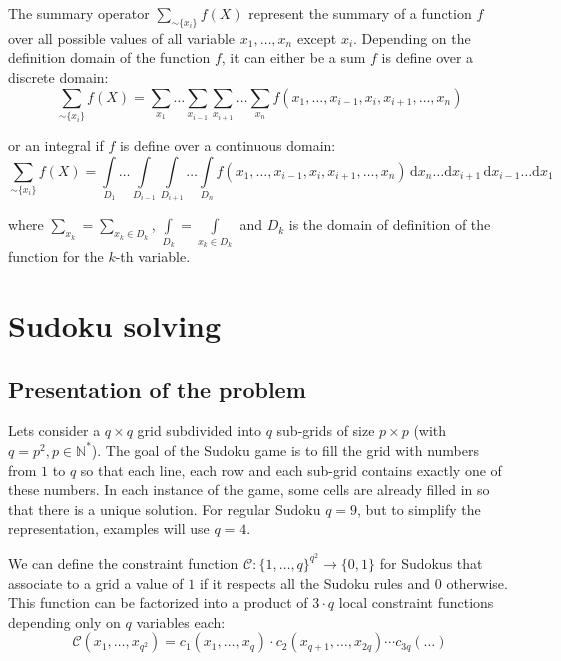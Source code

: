 \documentclass[a4paper,11pt]{report}
\newcommand{\N}{\mathbb{N}}
\newcommand{\set}[1]{\{#1\}}
\newcommand{\zo}{\set{0,1}}
\begin{document}
The summary operator $\sum_{\sim\set{x_i}} f(X)$ represent the summary of a function $f$ over all possible values of all variable $x_1,\dots,x_n$ except $x_i$. Depending on the definition domain of the function $f$, it can either be a sum $f$ is define over a discrete domain:
\begin{equation}
\sum_{\sim\set{x_i}} f(X) = \sum_{x_1} \dots \sum_{x_{i-1}} \sum_{x_{i+1}} \dots \sum_{x_n} f(x_1,\dots,x_{i-1},x_i,x_{i+1},\dots,x_n)
\end{equation}

or an integral if $f$ is define over a continuous domain:
\begin{equation}
\sum_{\sim\set{x_i}} f(X) = \int\limits_{D_1} \! \dots \! \int\limits_{D_{i-1}} \! \int\limits_{D_{i+1}}\! \dots \! \int\limits_{D_n} \! f(x_1,\dots,x_{i-1},x_i,x_{i+1},\dots,x_n)\, \mathrm{d}x_n \dots \mathrm{d}x_{i+1}\,\mathrm{d}x_{i-1}\dots\mathrm{d}x_1
\end{equation}

where $\sum\limits_{x_k} = \sum\limits_{x_k\in D_k}$, $\int\limits_{D_k} = \int\limits_{x_k\in D_k}$  and $D_k$ is the domain of definition of the function for the $k$-th variable.


\chapter{Sudoku solving}

\section{Presentation of the problem}

Lets consider a $q \times q$ grid subdivided into $q$ sub-grids of size $p \times p$ (with $q=p^2, p\in\N^*$). The goal of the Sudoku game is to fill the grid with numbers from $1$ to $q$ so that each line, each row and each sub-grid contains exactly one of these numbers. In each instance of the game, some cells are already filled in so that there is a unique solution. For regular Sudoku $q=9$, but to simplify the representation, examples will use $q=4$.

We can define the constraint function $\mathcal{C}: \set{1,\dots,q}^{q^2} \to \zo$ for Sudokus that associate to a grid a value of $1$ if it respects all the Sudoku rules and $0$ otherwise. This function can be factorized into a product of $3 \cdot q$ local constraint functions depending only on $q$ variables each:
\begin{equation}\label{eq:sudokuconst}
\mathcal{C}(x_1,\dots,x_{q^2}) = c_1(x_1,\dots,x_q) \cdot c_2(x_{q+1},\dots,x_{2q}) \cdots c_{3q}(\dots)
\end{equation}
\end{document}
